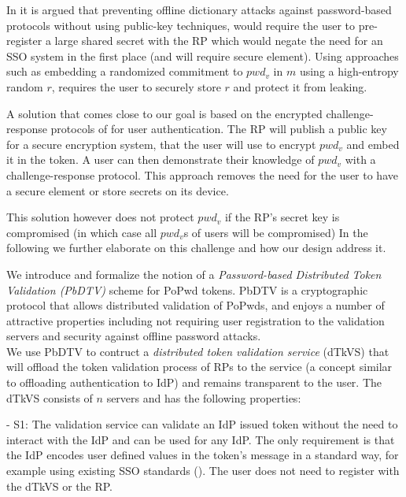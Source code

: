 \documentclass[conference]{IEEEtran}
\begin{document}
In \cite{HalveiKrawczyk99,Impagliazzo88} it is argued that preventing offline dictionary attacks against password-based protocols without using public-key techniques, would require the user to pre-register a large shared secret with the RP which would negate the need for an SSO system in the first place (and will require secure element). 
Using approaches such as embedding a randomized commitment %
to $pwd_{v}$ in $m$ using a high-entropy random  $r$, requires the user to securely store $r$ and protect it from leaking. 

A solution that comes close to our goal is based on the encrypted challenge-response protocols of \cite{Boyarsky99,HalveiKrawczyk99} for user authentication. The RP will publish a public key for a secure encryption system, that the user will use to encrypt $pwd_{v}$ and embed it in the token. A user can then demonstrate their knowledge of $pwd_{v}$ with a challenge-response protocol.%
This approach removes the need for the user to have a secure element or store secrets on its device.

This solution however %
does not protect $pwd_{v}$ if the RP's secret key is compromised (in which case all $pwd_v$s of users will be compromised)%
In the following we further elaborate %
on this challenge and how our design address it.


We introduce and formalize the notion of a {\em Password-based Distributed Token Validation (PbDTV)} scheme for PoPwd tokens. PbDTV is a cryptographic protocol that allows distributed validation of  PoPwds, and enjoys a number of attractive properties including not requiring user registration to the validation servers and security against offline password attacks.\\
We use PbDTV to contruct a {\em distributed token validation service} (dTkVS) that will %
offload the token validation process of RPs to the service (a concept similar to offloading authentication to IdP) and remains transparent to the user. The dTkVS consists of $n$ servers %
and has the following properties: 

- S1: The validation service can validate an IdP issued token without the need to interact with the IdP and can be used for any IdP. %
The only requirement is that the IdP encodes user defined values in the token's message in a standard way, for example using existing SSO standards  (\cite{openIDConnect,SAML}).
The user does not need to register with the dTkVS or the RP.
\end{document}
